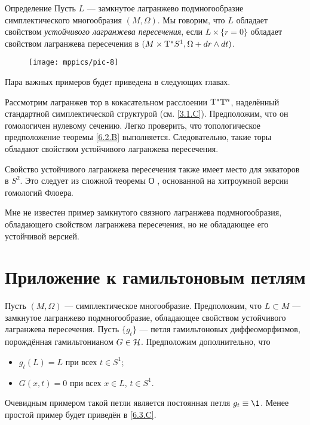 \begin{ex}{Определение}\label{6.2.C}
Пусть $L$ — замкнутое лагранжево подмногообразие симплектического многообразия $(M, \Omega)$.
Мы говорим, что $L$ обладает свойством \emph{устойчивого лагранжева пересечения}, если $L \times \{r = 0\}$ обладает свойством лагранжева пересечения в $(M \z\times \T^\ast S^1, \Omega + \d r \wedge \d t)$.
\end{ex}


\begin{wrapfigure}{o}{25 mm}
\vskip-3mm
\centering
\texttt{[image: mppics/pic-8]}
\caption{}\label{pic-8}
\vskip0mm
\end{wrapfigure}


Пара важных примеров будет приведена в следующих главах.

\begin{ex}{}\label{6.2.D}
Рассмотрим лагранжев тор в кокасательном расслоении $\mathrm{T}^\ast \mathbb{T}^n$, наделённый стандартной симплектической структурой (см. \ref{3.1.C}).
Предположим, что он гомологичен нулевому сечению.
Легко проверить, что топологическое предположение теоремы \ref{6.2.B} выполняется.
Следовательно, такие торы обладают свойством устойчивого лагранжева пересечения.
\end{ex}




\begin{ex}[Экватор на $S^2$.]{}\label{6.2.E}
Свойство устойчивого лагранжева пересечения также имеет место для экваторов в $S^2$.
Это следует из сложной теоремы О \cite{O1,O2}, основанной на хитроумной версии гомологий Флоера.
\end{ex}


Мне не известен пример замкнутого связного лагранжева подмногообразия, обладающего свойством лагранжева пересечения, но не обладающее его устойчивой версией.


\section{Приложение к гамильтоновым петлям}

Пусть $(M, \Omega)$ — симплектическое многообразие.
Предположим, что $L \subset M$ — замкнутое лагранжево подмногообразие, обладающее свойством устойчивого лагранжева пересечения.  
Пусть $\{g_t\}$ — петля гамильтоновых диффеоморфизмов, порождённая
гамильтонианом $G \in \mathcal{H}$. 
Предположим дополнительно, что
\begin{itemize}
\item $g_t (L) = L$ при всех $t \in S^1$; 
\item $G (x, t) = 0$ при всех $x \in L$, $t \in S^1$.
\end{itemize}
Очевидным примером такой петли является постоянная петля $g_t \z\equiv \1$.
Менее простой пример будет приведён в \ref{6.3.C}.

